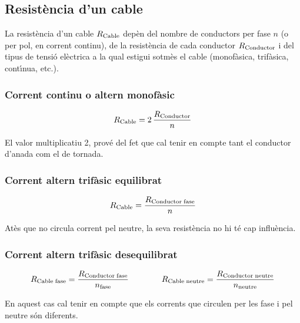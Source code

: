 \subsection{Resist\`{e}ncia d'un cable}

La resist\`{e}ncia d'un cable $R_\mathrm{Cable}$ dep\`{e}n del nombre de conductors per fase $n$ (o
per pol, en corrent continu), de la resist\`{e}ncia de cada conductor $R_\mathrm{Conductor}$ i del
tipus de tensi\'{o} el\`{e}ctrica a la qual estigui sotm\`{e}s el cable (monof\`{a}sica, trif\`{a}sica,
cont\'{\i}nua, etc.).

\subsubsection*{Corrent continu o altern monof\`{a}sic}
\begin{equation}\label{eq:r_cc_mono}
    R_\mathrm{Cable} = 2\, \frac{R_\mathrm{Conductor}}{n}
\end{equation}

El valor multiplicatiu 2, prov\'{e} del fet que cal tenir en compte tant el conductor d'anada
com el de tornada.

\subsubsection*{Corrent altern trif\`{a}sic equilibrat}
\vspace{-5mm}
\begin{equation}\label{eq:r_trifas}
R_\mathrm{Cable} = \frac{R_\mathrm{Conductor\;fase}}{n}
\end{equation}

At\`{e}s que no circula corrent pel neutre, la seva resist\`{e}ncia no hi t\'{e} cap influ\`{e}ncia.

\subsubsection*{Corrent altern trif\`{a}sic desequilibrat}
\begin{equation}
    R_\mathrm{Cable\;fase} = \frac{R_\mathrm{Conductor\;fase}}{n_\mathrm{fase}} \qquad\qquad
    R_\mathrm{Cable\; neutre} = \frac{R_\mathrm{Conductor\;neutre}}{n_\mathrm{neutre}}
\end{equation}

En aquest cas cal tenir en compte que els corrents que circulen per les fase i pel neutre
s\'{o}n diferents.

